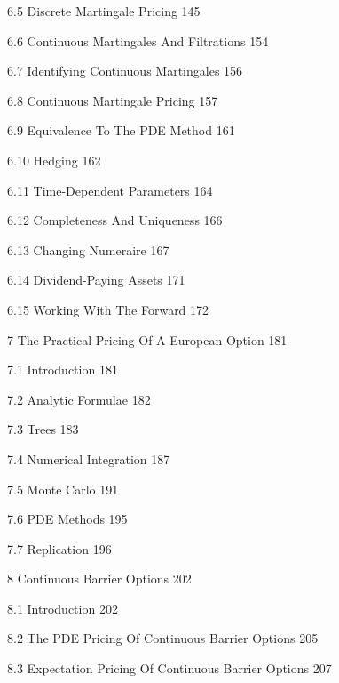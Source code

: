 6.5 Discrete Martingale Pricing 145



6.6 Continuous Martingales And Filtrations 154



6.7 Identifying Continuous Martingales 156



6.8 Continuous Martingale Pricing 157



6.9 Equivalence To The PDE Method 161



6.10 Hedging 162



6.11 Time-Dependent Parameters 164



6.12 Completeness And Uniqueness 166



6.13 Changing Numeraire 167



6.14 Dividend-Paying Assets 171



6.15 Working With The Forward 172



7 The Practical Pricing Of A European Option 181



7.1 Introduction 181



7.2 Analytic Formulae 182



7.3 Trees 183



7.4 Numerical Integration 187



7.5 Monte Carlo 191



7.6 PDE Methods 195



7.7 Replication 196



8 Continuous Barrier Options 202



8.1 Introduction 202



8.2 The PDE Pricing Of Continuous Barrier Options 205



8.3 Expectation Pricing Of Continuous Barrier Options 207



